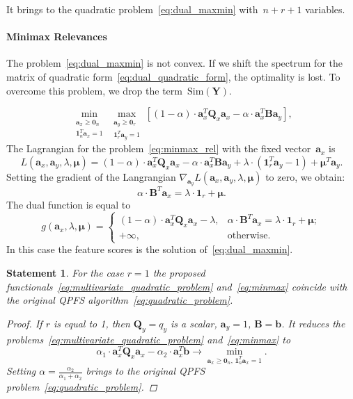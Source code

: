 \documentclass[12pt,twoside]{article}
\newtheorem{statement}{Statement}
\newcommand{\ba}{\mathbf{a}}
\newcommand{\bb}{\mathbf{b}}
\newcommand{\bY}{\mathbf{Y}}
\newcommand{\bB}{\mathbf{B}}
\newcommand{\bQ}{\mathbf{Q}}
\newcommand{\bmu}{\boldsymbol{\mu}}
\newcommand{\bOne}{\boldsymbol{1}}
\newcommand{\bZero}{\boldsymbol{0}}
\begin{document}
It brings to the quadratic problem~\eqref{eq:dual_maxmin} with~$n + r + 1$ variables.

\paragraph{Minimax Relevances}

The problem~\eqref{eq:dual_maxmin} is not convex. If we shift the spectrum for the matrix of quadratic form~\eqref{eq:dual_quadratic_form}, the optimality is lost. To overcome this problem, we drop the term~$\text{Sim}(\bY)$. 

\begin{equation}
\min_{\substack{\ba_x \geq \bZero_n \\ \bOne_n^T\ba_x=1}} 	\max_{\substack{\ba_y \geq \bZero_r \\ \bOne_r^T\ba_y=1}} \left[ (1 - \alpha) \cdot \ba_x^T \bQ_x \ba_x - \alpha \cdot \ba_x^T \bB \ba_y \right],
\label{eq:minmax_rel}
\end{equation}
The Lagrangian for the problem~\eqref{eq:minmax_rel} with the fixed vector~$\ba_x$ is
\[
L(\ba_x, \ba_y, \lambda, \bmu) = (1 - \alpha) \cdot \ba_x^T \bQ_x \ba_x - \alpha \cdot \ba_x^T \bB \ba_y + \lambda \cdot  (\bOne_r^T \ba_y - 1) + \bmu^T \ba_y.
\]
Setting the gradient of the Langrangian $\nabla_{\ba_y} L(\ba_x, \ba_y, \lambda, \bmu)$ to zero, we obtain:
\begin{equation*}
\alpha \cdot \bB^T \ba_x = \lambda \cdot \bOne_r + \bmu.
\end{equation*}
The dual function is equal to
\begin{equation}
g(\ba_x, \lambda, \bmu) =
\begin{cases}
(1 - \alpha) \cdot \ba_x^T \bQ_x \ba_x - \lambda, & \alpha \cdot \bB^T \ba_x = \lambda \cdot \bOne_r + \bmu;  \\
+ \infty, & \text{otherwise}.
\end{cases}
\end{equation} 
In this case the feature scores is the solution of~\eqref{eq:dual_maxmin}. 

\begin{statement}
	For the case $r=1$ the proposed functionals~\eqref{eq:multivariate_quadratic_problem} and~\eqref{eq:minmax} coincide with the original QPFS algorithm~\eqref{eq:quadratic_problem}.
	
	\begin{proof}
		If $r$ is equal to 1, then $\bQ_y = q_y$ is a scalar, $\ba_y = 1$, $\bB = \bb$. It reduces the problems~\eqref{eq:multivariate_quadratic_problem} and~\eqref{eq:minmax} to 
		\[
		\alpha_1 \cdot \ba_x^T \bQ_x \ba_x - \alpha_2 \cdot \ba_x^T \bb \rightarrow \min_{\ba_x \geq \bZero_n, \, \bOne_n^T\ba_x=1} .
		\]
		Setting $\alpha = \frac{\alpha_2}{\alpha_1 + \alpha_2}$ brings to the original QPFS problem~\eqref{eq:quadratic_problem}.
	\end{proof}
\end{statement}
\end{document}
